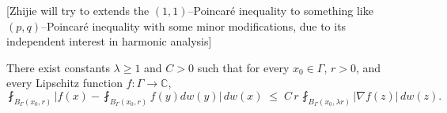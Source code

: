 \documentclass[12pt]{amsart}
\begin{document}
{\color{red}[Zhijie will try to extends the $(1,1)$--Poincar\'e inequality to something like $(p,q)$--Poincar\'e inequality with some minor modifications, due to its independent interest in harmonic analysis]}
\begin{theorem}\label{main:Poincaredunkl}
There exist constants $\lambda\ge1$ and $C>0$ such that for every $x_0\in\Gamma$, $r>0$, and every Lipschitz function $f:\Gamma\to\mathbb{C}$,
\begin{equation}\label{eq:Poincare11-chamber}
\fint_{B_\Gamma(x_0,r)}
\big|f(x)-\fint_{B_\Gamma(x_0,r)}f(y)dw(y)\big|\,dw(x)
\;\le\;
C\,r\,\fint_{B_\Gamma(x_0,\lambda r)} |\nabla f(z)|\,dw(z).
\end{equation}
\end{theorem}
\end{document}
